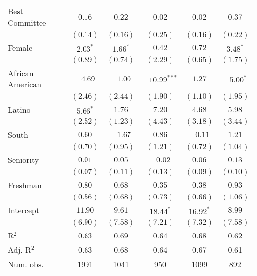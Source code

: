\documentclass[12pt]{article}
\begin{document}
\begin{table}[H]
\begin{threeparttable}
\begin{tabular}{l c c c c c }
Best Committee        & $0.16$        & $0.22$       & $0.02$         & $0.02$       & $0.37$       \\
                      & $(0.14)$      & $(0.16)$     & $(0.25)$       & $(0.16)$     & $(0.22)$     \\
Female                & $2.03^{*}$    & $1.66^{*}$   & $0.42$         & $0.72$       & $3.48^{*}$   \\
                      & $(0.89)$      & $(0.74)$     & $(2.29)$       & $(0.65)$     & $(1.75)$     \\
African American      & $-4.69$       & $-1.00$      & $-10.99^{***}$ & $1.27$       & $-5.00^{*}$  \\
                      & $(2.46)$      & $(2.44)$     & $(1.90)$       & $(1.10)$     & $(1.95)$     \\
Latino                & $5.66^{*}$    & $1.76$       & $7.20$         & $4.68$       & $5.98$       \\
                      & $(2.52)$      & $(1.23)$     & $(4.43)$       & $(3.18)$     & $(3.44)$     \\
South                 & $0.60$        & $-1.67$      & $0.86$         & $-0.11$      & $1.21$       \\
                      & $(0.70)$      & $(0.95)$     & $(1.21)$       & $(0.72)$     & $(1.04)$     \\
Seniority             & $0.01$        & $0.05$       & $-0.02$        & $0.06$       & $0.13$       \\
                      & $(0.07)$      & $(0.11)$     & $(0.13)$       & $(0.09)$     & $(0.10)$     \\
Freshman              & $0.80$        & $0.68$       & $0.35$         & $0.38$       & $0.93$       \\
                      & $(0.56)$      & $(0.68)$     & $(0.73)$       & $(0.66)$     & $(1.06)$     \\
Intercept             & $11.90$       & $9.61$       & $18.44^{*}$    & $16.92^{*}$  & $8.99$       \\
                      & $(6.90)$      & $(7.58)$     & $(7.21)$       & $(7.32)$     & $(7.58)$     \\
\hline
R$^2$                 & 0.63          & 0.69         & 0.64           & 0.68         & 0.62         \\
Adj. R$^2$            & 0.63          & 0.68         & 0.64           & 0.67         & 0.61         \\
Num. obs.             & 1991          & 1041         & 950            & 1099         & 892          \\

\end{tabular}
\end{threeparttable}
\end{table}
\end{document}
